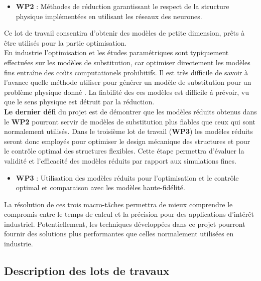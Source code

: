 \documentclass[12pt, french]{article}
\begin{document}
\begin{itemize}
	\item \textbf{WP2} : Méthodes de réduction garantissant le respect de la structure physique implémentées en utilisant les réseaux des neurones.\\
\end{itemize}

Ce lot de travail consentira d'obtenir des modèles de petite dimension, prêts à être utilisés pour la partie optimisation.\\ 

En industrie l'optimisation et les études paramétriques sont typiquement effectuées sur les modèles de substitution, car optimiser directement les modèles fins entraîne des coûts computationels prohibitifs. Il est très difficile de savoir \`a l'avance quelle méthode utiliser pour générer un modèle de substitution pour un problème physique donné \cite{lancaster2018}. La fiabilité des ces modèles est difficile \'a prévoir, vu que le sens physique est détruit par la réduction. \\
\textbf{Le dernier défi} du projet est de démontrer que les modèles réduits obtenus dans le \textbf{WP2} pourront servir de modèles de substitution plus fiables que ceux qui sont normalement utilisés. Dans le troisième lot de travail (\textbf{WP3}) les modèles réduits seront donc employés pour optimiser le design mécanique des structures et pour le contrôle optimal des structures flexibles. Cette étape permettra d’évaluer la validité et l’efficacité des modèles réduits par rapport aux simulations fines. \\

	\begin{itemize}
		\item \textbf{WP3} : Utilisation des modèles réduits pour l'optimisation et le contrôle optimal et comparaison avec les  modèles haute-fidélité. \\
	\end{itemize}
	
La résolution de ces trois macro-tâches permettra de mieux comprendre le compromis entre le temps de calcul et la précision pour des applications d'intérêt industriel. Potentiellement, les techniques développées dans ce projet pourront fournir des solutions plus performantes que celles normalement utilisées en industrie. 

\subsection{Description des lots de travaux}
	
\end{document}
